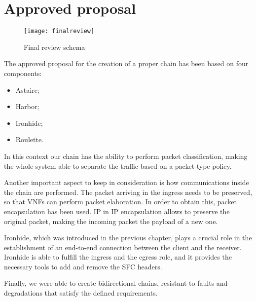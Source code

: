 \section{Approved proposal}

\begin{figure}[t]
  \centering
  \texttt{[image: finalreview]}
  \caption{Final review schema}
  \label{chap:impl:img:finalreview}
\end{figure}

The approved proposal for the creation of a proper chain has been based on four components:
\begin{itemize}
\item Astaire;
\item Harbor;
\item Ironhide;
\item Roulette.
\end{itemize}

In this context our chain has the ability to perform packet classification,
making the whole system able to separate the traffic based on a packet-type
policy. 

Another important aspect to keep in consideration is how communications inside
the chain are performed. The packet arriving in the ingress needs to be
preserved, so that VNFs can perform packet elaboration. In order to obtain this,
packet encapsulation has been used. IP in IP encapsulation allows to preserve
the original packet, making the incoming packet the payload of a new one.

Ironhide, which was introduced in the previous chapter, plays a crucial role in
the establishment of an end-to-end connection between the client and the
receiver. Ironhide is able to fulfill the ingress and the egress role, and it
provides the necessary tools to add and remove the SFC headers.

Finally, we were able to create bidirectional chains, resistant to faults and
degradations that satisfy the defined requirements.
